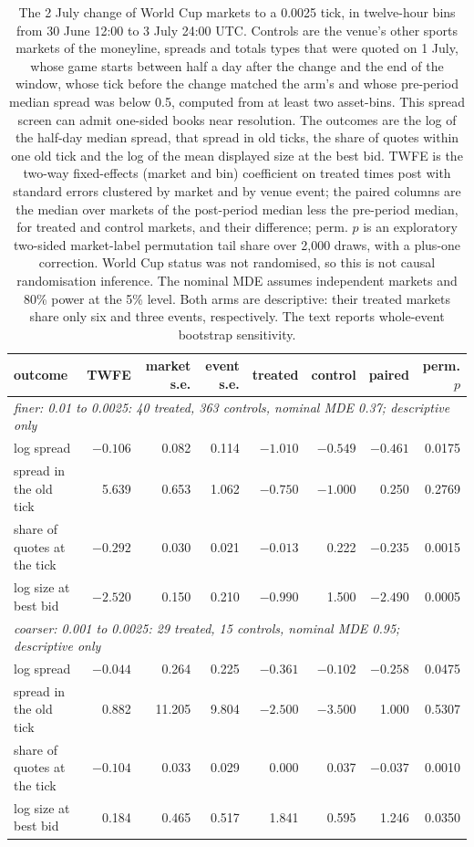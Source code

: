 \begin{table}[htbp]
\centering\scriptsize\setlength{\tabcolsep}{3.5pt}
\begin{tabular}{lrrrrrrr}
\toprule
outcome & TWFE & market s.e. & event s.e. & treated & control & paired & perm. $p$ \\
\midrule
\multicolumn{8}{l}{\emph{finer: 0.01 to 0.0025: 40 treated, 363 controls, nominal MDE 0.37; descriptive only}} \\
log spread & $-0.106$ & 0.082 & 0.114 & $-1.010$ & $-0.549$ & $-0.461$ & 0.0175 \\
spread in the old tick & 5.639 & 0.653 & 1.062 & $-0.750$ & $-1.000$ & 0.250 & 0.2769 \\
share of quotes at the tick & $-0.292$ & 0.030 & 0.021 & $-0.013$ & 0.222 & $-0.235$ & 0.0015 \\
log size at best bid & $-2.520$ & 0.150 & 0.210 & $-0.990$ & 1.500 & $-2.490$ & 0.0005 \\
\multicolumn{8}{l}{\emph{coarser: 0.001 to 0.0025: 29 treated, 15 controls, nominal MDE 0.95; descriptive only}} \\
log spread & $-0.044$ & 0.264 & 0.225 & $-0.361$ & $-0.102$ & $-0.258$ & 0.0475 \\
spread in the old tick & 0.882 & 11.205 & 9.804 & $-2.500$ & $-3.500$ & 1.000 & 0.5307 \\
share of quotes at the tick & $-0.104$ & 0.033 & 0.029 & 0.000 & 0.037 & $-0.037$ & 0.0010 \\
log size at best bid & 0.184 & 0.465 & 0.517 & 1.841 & 0.595 & 1.246 & 0.0350 \\
\bottomrule
\end{tabular}
\caption{The 2 July change of World Cup markets to a 0.0025 tick, in twelve-hour bins from 30 June 12:00 to 3 July 24:00 UTC. Controls are the venue's other sports markets of the moneyline, spreads and totals types that were quoted on 1 July, whose game starts between half a day after the change and the end of the window, whose tick before the change matched the arm's and whose pre-period median spread was below 0.5, computed from at least two asset-bins. This spread screen can admit one-sided books near resolution. The outcomes are the log of the half-day median spread, that spread in old ticks, the share of quotes within one old tick and the log of the mean displayed size at the best bid. TWFE is the two-way fixed-effects (market and bin) coefficient on treated times post with standard errors clustered by market and by venue event; the paired columns are the median over markets of the post-period median less the pre-period median, for treated and control markets, and their difference; perm. $p$ is an exploratory two-sided market-label permutation tail share over 2{,}000 draws, with a plus-one correction. World Cup status was not randomised, so this is not causal randomisation inference. The nominal MDE assumes independent markets and 80\% power at the 5\% level. Both arms are descriptive: their treated markets share only six and three events, respectively. The text reports whole-event bootstrap sensitivity.}
\label{tab:worldcup}
\end{table}
